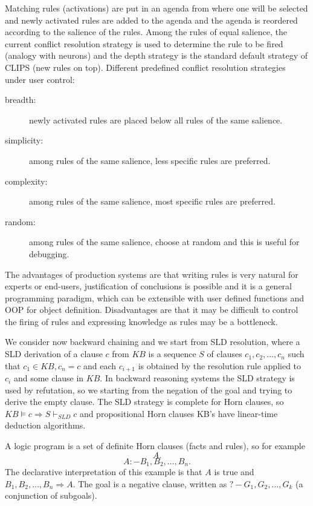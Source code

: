 Matching rules (activations) are put in an agenda from where one will be selected and 
newly activated rules are added to the agenda and the agenda is reordered
according to the salience of the rules.\newline
Among the rules of equal salience, the current conflict resolution strategy is used
to determine the rule to be fired (analogy with neurons) and the depth strategy is the 
standard default strategy of CLIPS (new rules on top).\newline
Different predefined conflict resolution strategies under user control:
\begin{description}
   \item [breadth: ] newly activated rules are placed below all rules of the same salience.
   \item [simplicity: ] among rules of the same salience, less specific rules are preferred.
   \item [complexity: ] among rules of the same salience, most specific rules are preferred.
   \item [random: ] among rules of the same salience, choose at random and this is 
	           useful for debugging.
\end{description}
The advantages of production systems are that writing rules is very natural for experts or 
end-users, justification of conclusions is possible and it is a general programming paradigm,
which can be extensible with user defined functions and OOP for object definition.\newline
Disadvantages are that it may be difficult to control the firing of rules and expressing
knowledge as rules may be a bottleneck.

We consider now backward chaining and we start from SLD resolution, where 
a SLD derivation of a clause $c$ from $KB$ is a sequence $S$ of clauses
$c_1, c_2, \dots, c_n$ such that $c_1 \in KB, c_n = c$ and each $c_{i+1}$ is obtained 
by the resolution rule applied to $c_i$ and some clause in $KB$.\newline
In backward reasoning systems the SLD strategy is used by refutation, so we starting from the
negation of the goal and trying to derive the empty clause.\newline
The SLD strategy is complete for Horn clauses, so $KB \models c \Rightarrow S \vdash_{SLD} c$
and propositional Horn clauses KB's have linear-time deduction algorithms.

A logic program is a set of definite Horn clauses (facts and rules), so for example
\[ A. \]
\[ A:- B_1, B_2, \dots, B_n. \]
The declarative interpretation of this example is that $A$ is true and $B_1, B_2, \dots, B_n
\Rightarrow A$.\newline
The goal is a negative clause, written as $?- G_1, G_2, \dots, G_k$ (a conjunction of subgoals).

